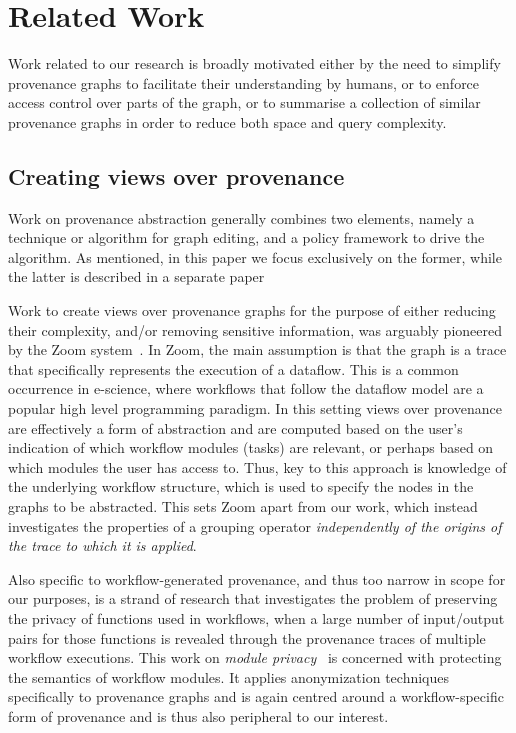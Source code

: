 \section{Related Work}  \label{sec:related}

Work related to our research is broadly motivated either by the need to simplify provenance graphs to facilitate their understanding by humans, or to enforce access control over parts of the graph, or to summarise a collection of similar provenance graphs in order to reduce both space and query complexity.

\subsection{Creating views over provenance}

Work on provenance abstraction generally combines two elements, namely a technique or algorithm for graph editing, and a policy framework to drive the algorithm. As mentioned, in this paper we focus exclusively on the former, while the latter is described in a separate paper
 

Work to create views over provenance graphs for the purpose of either reducing their complexity, and/or removing sensitive information, was arguably pioneered by the Zoom system~\citep{DBLP:conf/icde/BitonBDH08}. In Zoom, the main assumption is that  the graph is a trace that specifically represents the execution of a dataflow. This is a common occurrence in e-science, where workflows that follow the  dataflow model are a popular high level programming paradigm.
%
In this setting views over provenance are effectively a form of abstraction and are computed based on the user's indication of which workflow modules (tasks) are relevant, or perhaps based on which modules the user has access to. Thus, key to this approach is knowledge of the underlying workflow structure, which is used to specify the nodes in the graphs to be abstracted. This sets Zoom apart from our work, which instead investigates the properties of a grouping operator \textit{independently of the origins of the trace to which it is applied}. 

Also specific to workflow-generated provenance, and thus too narrow in scope for our purposes, is a  strand of research that investigates the problem of preserving the privacy of functions used in workflows, when a large number of input/output pairs for those functions is revealed through the provenance traces of multiple workflow executions. This work on  \textit{module privacy}~\citep{Davidson:2011:PP:1938551.1938554,Davidson2010a,Davidson:2011:PVM:1989284.1989305} is concerned with protecting the semantics of workflow modules. 
It applies anonymization techniques specifically to provenance graphs and is again centred around a workflow-specific form of provenance and  is thus also peripheral to our interest.


